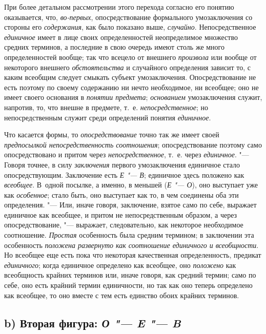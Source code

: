 {{При более детальном рассмотрении этого перехода согласно его
понятию оказывается, что,
{\em во-первых},
опосредствование формального умозаключения со стороны его
{\em содержания}, как
было показано выше, {\em случайно}.
Непосредственное
{\em единичное} имеет в
лице своих определенностей неопределимое множество средних терминов, а
последние в свою очередь имеют столь же много определенностей вообще; так
что всецело от внешнего {\em произвола}
или вообще от некоторого внешнего
{\em обстоятельства} и
случайного определения зависит то, с каким всеобщим следует смыкать субъект
умозаключения. Опосредствование не есть поэтому по своему содержанию ни
нечто необходимое, ни всеобщее; оно не имеет своего основания в
{\em понятии предмета};
{\em основанием}
умозаключения служит, напротив, то, что внешне в предмете,
т.~е. {\em непосредственное};
но непосредственным служит среди определений понятия
{\em единичное}.

Что касается формы, то
{\em опосредствование}
точно так же имеет своей
{\em предпосылкой непосредственность
соотношения}; опосредствование поэтому само опосредствовано
и притом через {\em непосредственное},
т.~е. через
{\em единичное}. "--- Говоря
точнее, в силу {\em заключения}
первого умозаключения единичное стало опосредствующим.
Заключение есть {\em Е
"--- В}; единичное здесь положено как
{\em всеобщее}. В~одной
посылке, а именно, в меньшей ({\em Е
"--- О}), оно выступает уже как
{\em особенное}; стало
быть, оно выступает как то, в чем соединены оба эти определения. "---
Или, иначе говоря, заключение, взятое само по себе, выражает
единичное как всеобщее, и притом не непосредственным образом, а через
опосредствование, "--- выражает, следовательно, как некоторое
необходимое соотношение. {\em Простая}
особенность была средним термином; в заключении эта
особенность {\em положена развернуто как
соотношение единичного и всеобщности}. Но всеобщее еще есть
пока что некоторая качественная определенность, предикат
{\em единичного}; когда
единичное определено как всеобщее, оно
{\em положено} как
всеобщность крайних терминов или, иначе говоря, как средний термин; само по
себе, оно есть крайний термин единичности, но так как оно теперь определено
как всеобщее, то оно вместе с тем есть единство обоих крайних терминов.

\subsection[b) Вторая фигура]
{b) Вторая фигура: {\em О "--- E "--- B}}

}}
